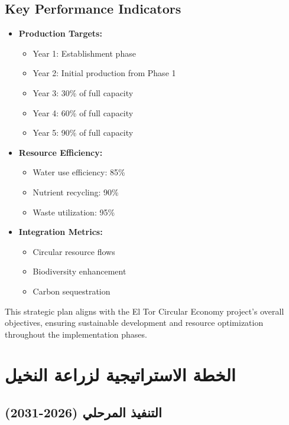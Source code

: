 \subsection{Key Performance Indicators}
\begin{itemize}
    \item \textbf{Production Targets:}
    \begin{itemize}
        \item Year 1: Establishment phase
        \item Year 2: Initial production from Phase 1
        \item Year 3: 30\% of full capacity
        \item Year 4: 60\% of full capacity
        \item Year 5: 90\% of full capacity
    \end{itemize}
    \item \textbf{Resource Efficiency:}
    \begin{itemize}
        \item Water use efficiency: 85\%
        \item Nutrient recycling: 90\%
        \item Waste utilization: 95\%
    \end{itemize}
    \item \textbf{Integration Metrics:}
    \begin{itemize}
        \item Circular resource flows
        \item Biodiversity enhancement
        \item Carbon sequestration
    \end{itemize}
\end{itemize}

This strategic plan aligns with the El Tor Circular Economy project's overall objectives, ensuring sustainable development and resource optimization throughout the implementation phases.

\section{الخطة الاستراتيجية لزراعة النخيل}

\subsection{التنفيذ المرحلي (2026-2031)}


